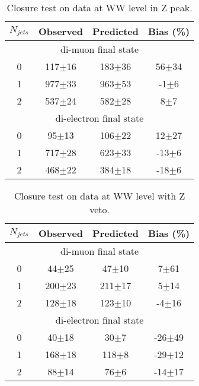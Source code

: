 \begin{table}[!ht]
\begin{center}
\begin{tabular} {|c|ccc|}
\hline
$N_{jets}$  & Observed & Predicted & Bias (\%) \\
\hline 
\hline
\multicolumn{4}{|c|}{di-muon final state} \\
\hline
0 & 117$\pm$16 & 183$\pm$36 & 56$\pm$34 \\
1 & 977$\pm$33 & 963$\pm$53 & -1$\pm$6  \\
2 & 537$\pm$24 & 582$\pm$28 &  8$\pm$7 \\
\hline 
\hline
\multicolumn{4}{|c|}{di-electron final state} \\
\hline
0 &  95$\pm$13 & 106$\pm$22 &  12$\pm$27 \\
1 & 717$\pm$28 & 623$\pm$33 & -13$\pm$6  \\
2 & 468$\pm$22 & 384$\pm$18 & -18$\pm$6  \\
\hline 
\end{tabular}
\caption{Closure test on data at WW level in Z peak.}
\label{tab:data_closure_ww_zp}
\end{center}
\end{table}

\begin{table}[!ht]
\begin{center}
\begin{tabular} {|c|ccc|}
\hline
$N_{jets}$  & Observed & Predicted & Bias (\%) \\
\hline 
\hline
\multicolumn{4}{|c|}{di-muon final state} \\
\hline
0 &  44$\pm$25 &  47$\pm$10 &  7$\pm$61 \\
1 & 200$\pm$23 & 211$\pm$17 &  5$\pm$14 \\
2 & 128$\pm$18 & 123$\pm$10 & -4$\pm$16 \\
\hline 
\hline
\multicolumn{4}{|c|}{di-electron final state} \\
\hline
0 &  40$\pm$18 &  30$\pm$7 & -26$\pm$49 \\
1 & 168$\pm$18 & 118$\pm$8 & -29$\pm$12  \\
2 &  88$\pm$14 &  76$\pm$6 & -14$\pm$17 \\
\hline 
\end{tabular}
\caption{Closure test on data at WW level with Z veto.}
\label{tab:data_closure_ww_zv}
\end{center}
\end{table}

